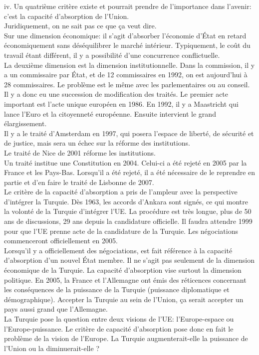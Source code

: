 \documentclass[12pt, a4paper, openany]{book}
\begin{document}
iv. Un quatrième critère existe et pourrait prendre de l'importance dans l'avenir: c'est la capacité d'absorption de l'Union. \\
Juridiquement, on ne sait pas ce que ça veut dire. \\
Sur une dimension économique: il s'agit d'absorber l'économie d'État en retard économiquement sans déséquilibrer le marché intérieur. Typiquement, le coût du travail étant différent, il y a possibilité d'une concurrence conflictuelle. \\
La deuxième dimension est la dimension institutionnelle. Dans la commission, il y a un commissaire par État, et de 12 commissaires en 1992, on est aujourd'hui à 28 commissaires. Le problème est le même avec les parlementaires ou au conseil. \\
Il y a donc eu une succession de modification des traités. Le premier acte important est l'acte unique européen en 1986. En 1992, il y a Maastricht qui lance l'Euro et la citoyenneté européenne. Ensuite intervient le grand élargissement. \\
Il y a le traité d'Amsterdam en 1997, qui posera l'espace de liberté, de sécurité et de justice, mais sera un échec sur la réforme des institutions. \\
Le traité de Nice de 2001 réforme les institutions. \\
Un traité institue une Constitution en 2004. Celui-ci a été rejeté en 2005 par la France et les Pays-Bas. Lorsqu'il a été rejeté, il a été nécessaire de le reprendre en partie et d'en faire le traité de Lisbonne de 2007. \\


Le critère de la capacité d'absorption a pris de l'ampleur avec la perspective d'intégrer la Turquie. Dès 1963, les accords d'Ankara sont signés, ce qui montre la volonté de la Turquie d'intégrer l'UE. La procédure est très longue, plus de 50 ans de discussions, 29 ans depuis la candidature officielle. Il faudra attendre 1999 pour que l'UE prenne acte de la candidature de la Turquie. Les négociations commenceront officiellement en 2005. \\
Lorsqu'il y a officiellement des négociations, est fait référence à la capacité d'absorption d'un nouvel État membre. Il ne s'agit pas seulement de la dimension économique de la Turquie. La capacité d'absorption vise surtout la dimension politique. En 2005, la France et l'Allemagne ont émis des réticences concernant les conséquences de la puissance de la Turquie (puissance diplomatique et démographique). Accepter la Turquie au sein de l'Union, ça serait accepter un pays aussi grand que l'Allemagne. \\
La Turquie pose la question entre deux visions de l'UE: l'Europe-espace ou l'Europe-puissance. Le critère de capacité d'absorption pose donc en fait le problème de la vision de l'Europe. La Turquie augmenterait-elle la puissance de l'Union ou la diminuerait-elle ?
\end{document}
